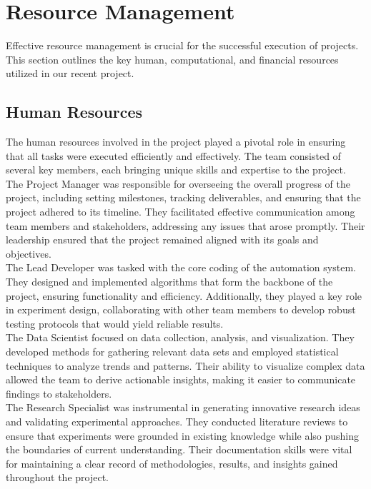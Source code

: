 \section{Resource Management}
Effective resource management is crucial for the successful execution of projects. This section outlines the key human, computational, and financial resources utilized in our recent project.

\subsection{Human Resources}
The human resources involved in the project played a pivotal role in ensuring that all tasks were executed efficiently and effectively. The team consisted of several key members, each bringing unique skills and expertise to the project. The Project Manager was responsible for overseeing the overall progress of the project, including setting milestones, tracking deliverables, and ensuring that the project adhered to its timeline. They facilitated effective communication among team members and stakeholders, addressing any issues that arose promptly. Their leadership ensured that the project remained aligned with its goals and objectives.\\The Lead Developer was tasked with the core coding of the automation system. They designed and implemented algorithms that form the backbone of the project, ensuring functionality and efficiency. Additionally, they played a key role in experiment design, collaborating with other team members to develop robust testing protocols that would yield reliable results.\\The Data Scientist focused on data collection, analysis, and visualization. They developed methods for gathering relevant data sets and employed statistical techniques to analyze trends and patterns. Their ability to visualize complex data allowed the team to derive actionable insights, making it easier to communicate findings to stakeholders.\\The Research Specialist was instrumental in generating innovative research ideas and validating experimental approaches. They conducted literature reviews to ensure that experiments were grounded in existing knowledge while also pushing the boundaries of current understanding. Their documentation skills were vital for maintaining a clear record of methodologies, results, and insights gained throughout the project.


